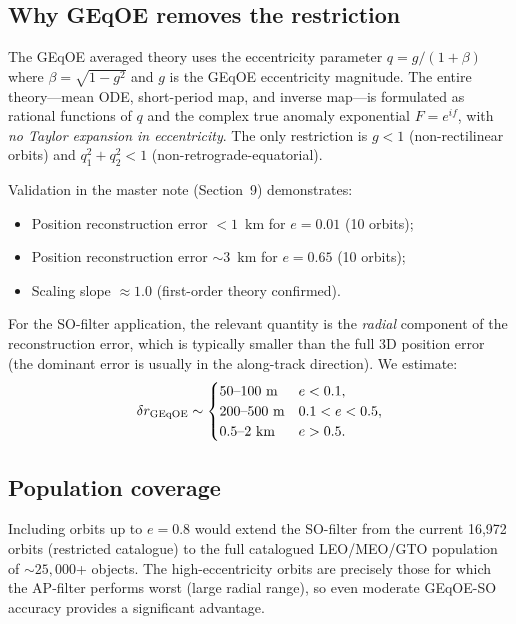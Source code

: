 \documentclass[11pt]{article}
\begin{document}
\subsection{Why GEqOE removes the restriction}

The GEqOE averaged theory uses the eccentricity parameter
$q = g/(1 + \beta)$ where $\beta = \sqrt{1 - g^2}$ and $g$ is the
GEqOE eccentricity magnitude. The entire theory---mean ODE, short-period
map, and inverse map---is formulated as rational functions of $q$ and the
complex true anomaly exponential $F = e^{if}$, with \emph{no Taylor
expansion in eccentricity}. The only restriction is $g < 1$ (non-rectilinear
orbits) and $q_1^2 + q_2^2 < 1$ (non-retrograde-equatorial).

Validation in the master note (Section~9) demonstrates:
\begin{itemize}
\item Position reconstruction error $< 1$~km for $e = 0.01$ (10 orbits);
\item Position reconstruction error $\sim\!3$~km for $e = 0.65$ (10 orbits);
\item Scaling slope $\approx 1.0$ (first-order theory confirmed).
\end{itemize}

For the SO-filter application, the relevant quantity is the \emph{radial}
component of the reconstruction error, which is typically smaller than the
full 3D position error (the dominant error is usually in the along-track
direction). We estimate:
\begin{equation}
\delta r_{\rm GEqOE} \sim
\begin{cases}
50\text{--}100~\text{m} & e < 0.1, \\
200\text{--}500~\text{m} & 0.1 < e < 0.5, \\
0.5\text{--}2~\text{km} & e > 0.5.
\end{cases}
\end{equation}

\subsection{Population coverage}

Including orbits up to $e = 0.8$ would extend the SO-filter from the current
16,972 orbits (restricted catalogue) to the full catalogued LEO/MEO/GTO
population of $\sim\!25{,}000$+ objects. The high-eccentricity orbits are
precisely those for which the AP-filter performs worst (large radial range),
so even moderate GEqOE-SO accuracy provides a significant advantage.
\end{document}

